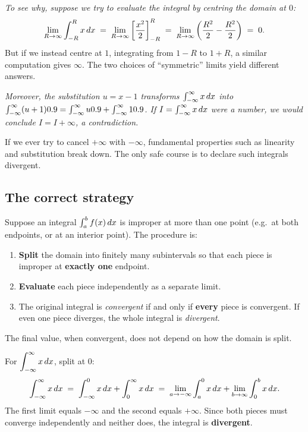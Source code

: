 \textit{To see why, suppose we try to evaluate the integral by centring the domain at $0$:}
\[
  \lim_{R\to\infty}\int_{-R}^{R}x\,dx
  \;=\; \lim_{R\to\infty}\left[\frac{x^{2}}{2}\right]_{-R}^{R}
  \;=\; \lim_{R\to\infty}\left(\frac{R^{2}}{2}-\frac{R^{2}}{2}\right)
  \;=\; 0.
\]
But if we instead centre at $1$, integrating from $1-R$ to $1+R$, a similar computation gives $\infty$.  The two choices of ``symmetric'' limits yield different answers.

\textit{Moreover, the substitution $u=x-1$ transforms $\int_{-\infty}^{\infty} x\,dx$ into $\int_{-\infty}^{\infty}(u+1)0.9 = \int_{-\infty}^{\infty}u0.9 + \int_{-\infty}^{\infty}10.9$.  If $I = \int_{-\infty}^{\infty}x\,dx$ were a number, we would conclude $I = I + \infty$, a contradiction.}

\begin{remark}[Warning]
If we ever try to cancel $+\infty$ with $-\infty$, fundamental properties such as linearity and substitution break down.  The only safe course is to declare such integrals divergent.
\end{remark}

\subsection*{The correct strategy}

\begin{definition}
\label{def:12-3}
Suppose an integral $\int_{a}^{b}f(x)\,dx$ is improper at more than one point (e.g.\ at both endpoints, or at an interior point).  The procedure is:
\begin{enumerate}
  \item \textbf{Split} the domain into finitely many subintervals so that each piece is improper at \textbf{exactly one} endpoint.
  \item \textbf{Evaluate} each piece independently as a separate limit.
  \item The original integral is \emph{convergent} if and only if \textbf{every} piece is convergent.  If even one piece diverges, the whole integral is \emph{divergent}.
\end{enumerate}
The final value, when convergent, does not depend on how the domain is split.
\end{definition}

\begin{example}
\label{ex:12-6}
For $\displaystyle\int_{-\infty}^{\infty}x\,dx$, split at $0$:
\[
  \int_{-\infty}^{\infty}x\,dx
  \;=\; \int_{-\infty}^{0}x\,dx + \int_{0}^{\infty}x\,dx
  \;=\; \lim_{a\to-\infty}\int_{a}^{0}x\,dx + \lim_{b\to\infty}\int_{0}^{b}x\,dx.
\]
The first limit equals $-\infty$ and the second equals $+\infty$.  Since both pieces must converge independently and neither does, the integral is \textbf{divergent}.
\end{example}

